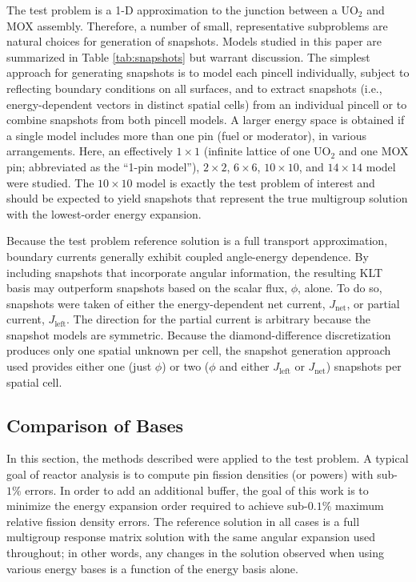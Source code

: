 \documentclass{anstrans}
\begin{document}
The test problem is a 1-D approximation to the junction between a UO$_2$ and MOX assembly.  Therefore, a number of small, representative subproblems are natural choices for generation of snapshots.  Models studied in this paper are summarized in Table \ref{tab:snapshots} but warrant discussion.  The simplest approach for generating snapshots is to model each pincell individually, subject to reflecting boundary conditions on all surfaces, and to extract snapshots (i.e., energy-dependent vectors in distinct spatial cells) from an individual pincell or to combine snapshots from both pincell models.  A larger energy space is obtained if a single model includes more than one pin (fuel or moderator), in various arrangements.  Here, an effectively $1\times 1$ (infinite lattice of one UO$_2$ and one MOX pin; abbreviated as the ``1-pin model''), $2 \times 2$, $6 \times 6$, $10 \times 10$, and $14 \times 14$ model were studied.  The $10 \times 10$ model is exactly the test problem of interest and should be expected to yield snapshots that represent the true multigroup solution with the lowest-order energy expansion.

Because the test problem reference solution is a full transport approximation, boundary currents generally exhibit coupled angle-energy dependence.  By including
snapshots that incorporate angular information, the resulting KLT basis may outperform snapshots based on the scalar flux, $\phi$, alone.  To do so, snapshots were taken of either the energy-dependent net current, $J_{\text{net}}$, or partial current, $J_{\text{left}}$.  The direction for the partial current is arbitrary because the snapshot models are symmetric. Because the diamond-difference discretization produces only one spatial unknown per cell, the snapshot generation approach
used provides either one (just $\phi$) or two ($\phi$ and either $J_{\text{left}}$ or $J_{\text{net}}$) snapshots per spatial cell.

\subsection{Comparison of Bases}

In this section, the methods described were applied to the test problem.
A typical goal of reactor analysis is to compute pin fission densities
(or powers) with sub-$1\%$ errors.  In order to add an additional
buffer, the goal of this work is to minimize the energy expansion order
required to achieve sub-$0.1\%$ maximum relative fission density errors.
The reference solution in all cases is a full multigroup response matrix solution
with the same angular expansion used throughout; in other words, any
changes in the solution observed when using various energy bases is a
function of the energy basis alone.
\end{document}
